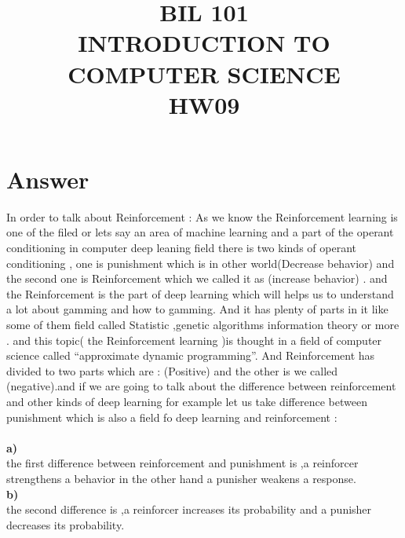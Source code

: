 \documentclass{article}
\title{BIL 101 \\ INTRODUCTION TO COMPUTER SCIENCE \\ HW09}
\date{}
\begin{document}
\maketitle
\section{Answer}
In order to talk about Reinforcement :   As we know the Reinforcement learning is one of the filed or lets say an area of machine learning  and a part of the operant conditioning in computer deep leaning field there is two kinds of operant conditioning , one is punishment which is in other world(Decrease behavior) and the second one is Reinforcement which we called it as (increase behavior) . and the Reinforcement  is the part of deep learning which will helps us to understand a lot about gamming and how to gamming. And it has plenty of parts in it like some of them field called Statistic ,genetic algorithms information theory or more . and this topic( the Reinforcement learning )is thought in a field of computer science   called “approximate dynamic programming”. And Reinforcement has divided to two parts which are : (Positive) and the other is we called (negative).and if we are going to talk about the difference between reinforcement and other kinds of deep learning for example let us take difference between punishment which is also a field fo deep learning and reinforcement : \\
\\\textbf{ a)}
\\the first difference between reinforcement and punishment is ,a reinforcer strengthens a behavior in the other hand a punisher weakens a response.
\\\textbf{b)}
\\the second difference is ,a reinforcer increases its probability and a punisher decreases 
its probability.
\end{document}
